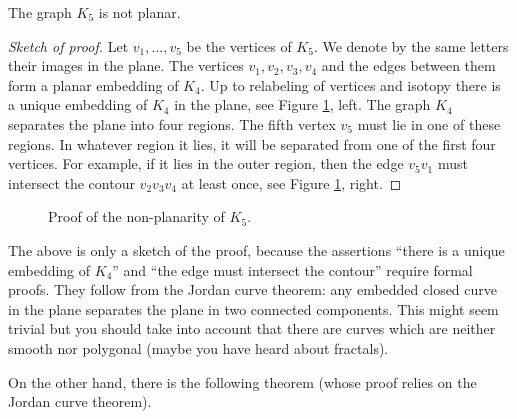 \begin{page}
\setcounter{section}{3}
\setcounter{subsection}{1}
\setcounter{dfn}{3}
\label{portion:327}

\begin{thm}
The graph $K_5$ is not planar.
\end{thm}

\end{page}

\begin{page}
\setcounter{section}{3}
\setcounter{subsection}{1}
\setcounter{dfn}{3}
\label{portion:328}

\begin{proof}[Sketch of proof]
Let $v_1, \ldots, v_5$ be the vertices of $K_5$.
We denote by the same letters their images in the plane.
The vertices $v_1, v_2, v_3, v_4$ and the edges between them form a planar embedding of $K_4$.
Up to relabeling of vertices and isotopy there is a unique embedding of $K_4$ in the plane, see Figure \ref{fig:K4Embedding}, left.
The graph $K_4$ separates the plane into four regions.
The fifth vertex $v_5$ must lie in one of these regions.
In whatever region it lies, it will be separated from one of the first four vertices.
For example, if it lies in the outer region,
then the edge $v_5v_1$ must intersect the contour $v_2v_3v_4$ at least once, see Figure \ref{fig:K4Embedding}, right.
\end{proof}

\begin{figure}[ht]
\begin{center}

\end{center}
\caption{Proof of the non-planarity of $K_5$.}
\label{fig:K4Embedding}
\end{figure}

The above is only a sketch of the proof, because the assertions
``there is a unique embedding of $K_4$'' and ``the edge must intersect the contour'' require formal proofs.
They follow from the Jordan curve theorem: any embedded closed curve in the plane separates the plane in two connected components.
This might seem trivial but you should take into account that there are curves which are neither smooth nor polygonal
(maybe you have heard about fractals).

On the other hand, there is the following theorem (whose proof relies on the Jordan curve theorem).

\end{page}

